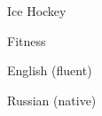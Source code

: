 \begin{cvskills}{0}{0}
            {\faSkating}      %
            {
                \begin{cvitems}
                    \item {Ice Hockey}
                    \item {Fitness}
                \end{cvitems}
            }
            {\faLanguage}      %
            {
                \begin{cvitems}
                    \item {English (fluent)}
                    \item {Russian (native)}
                \end{cvitems}            }

\end{cvskills}
